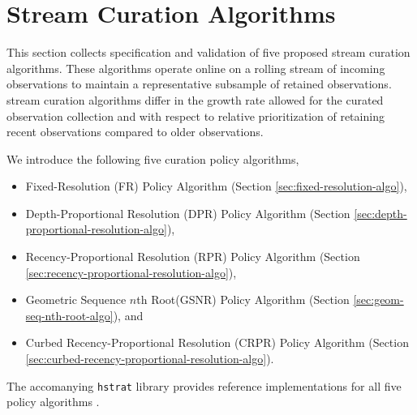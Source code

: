 \section{Stream Curation Algorithms} \label{sec:annotation-algorithms}



This section collects specification and validation of five proposed stream curation algorithms.
These algorithms operate online on a rolling stream of incoming observations to maintain a representative subsample of retained observations.
stream curation algorithms differ in the growth rate allowed for the curated observation collection and with respect to relative prioritization of retaining recent observations compared to older observations.


We introduce the following five curation policy algorithms,
\begin{itemize}
\item Fixed-Resolution (FR) Policy Algorithm (Section \ref{sec:fixed-resolution-algo}),
\item Depth-Proportional Resolution (DPR) Policy Algorithm (Section \ref{sec:depth-proportional-resolution-algo}),
\item Recency-Proportional Resolution (RPR) Policy Algorithm (Section \ref{sec:recency-proportional-resolution-algo}),
\item Geometric Sequence $n$th Root(GSNR) Policy Algorithm (Section \ref{sec:geom-seq-nth-root-algo}), and
\item Curbed Recency-Proportional Resolution (CRPR) Policy Algorithm (Section \ref{sec:curbed-recency-proportional-resolution-algo}).
\end{itemize}
The accomanying \texttt{hstrat} library provides reference implementations for all five policy algorithms \citep{moreno2022hstrat}.

